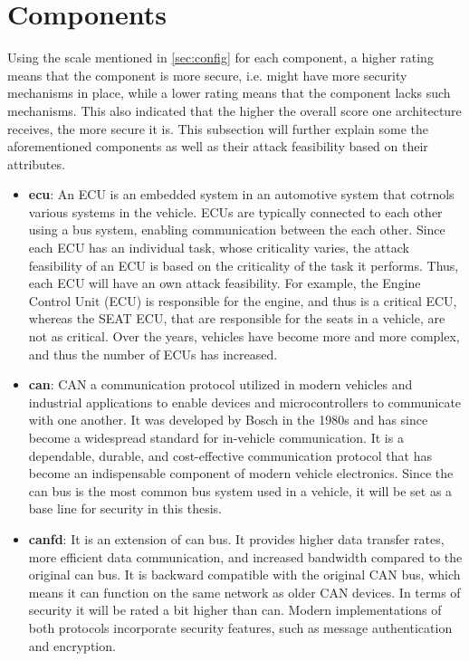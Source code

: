 \section{Components}
\label{sec:components}

Using the scale mentioned in \ref{sec:config} for each component, a higher rating means that the component is more secure, i.e. might have more security mechanisms in place,
while a lower rating means that the component lacks such mechanisms.
This also indicated that the higher the overall score one architecture receives, the more secure it is.
This subsection will further explain some the aforementioned components as well as their attack feasibility based on their attributes.

\begin{itemize}
    \item \textbf{\gls{ecu}}: An ECU is an embedded system in an automotive system that cotrnols various systems in the vehicle.
    ECUs are typically connected to each other using a bus system, enabling communication between the each other.
    Since each ECU has an individual task, whose criticality varies, the attack feasibility of an ECU is based on the criticality of the task it performs.
    Thus, each ECU will have an own attack feasibility. 
    For example, the Engine Control Unit (ECU) is responsible for the engine, and thus is a critical ECU, 
    whereas the SEAT ECU, that are responsible for the seats in a vehicle, are not as critical.
    Over the years, vehicles have become more and more complex, and thus the number of ECUs has increased.
    
    \item \textbf{\gls{can}}: CAN a communication protocol utilized in modern vehicles and industrial applications 
    to enable devices and microcontrollers to communicate with one another. 
    It was developed by Bosch in the 1980s and has since become a widespread standard for in-vehicle communication.
    It is a dependable, durable, and cost-effective communication protocol that has become an indispensable component of modern vehicle electronics.
    Since the \gls{can} bus is the most common bus system used in a vehicle, it will be set as a base line for security in this thesis.

    \item \textbf{\gls{canfd}}: It is an extension of \gls{can} bus.
    It provides higher data transfer rates, more efficient data communication, and increased bandwidth compared to the original \gls{can} bus.
    It is backward compatible with the original CAN bus, which means it can function on the same network as older CAN devices.
    In terms of security it will be rated a bit higher than \gls{can}.
    Modern implementations of both protocols incorporate security features, such as message authentication and encryption.
    

\end{itemize}

